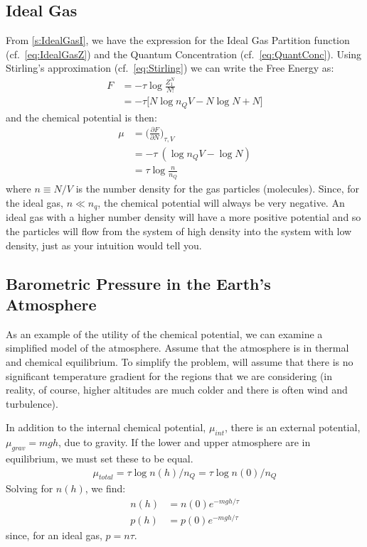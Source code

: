 \subsection{Ideal Gas}
From \cref{s:IdealGasI}, we have the expression for the Ideal Gas
Partition function (cf.~\cref{eq:IdealGasZ}) and the Quantum 
Concentration (cf.~\cref{eq:QuantConc}). Using Stirling's 
approximation (cf.~\cref{eq:Stirling}) we can write the Free Energy
as:
\begin{align}
F &= -\tau \log{\frac{Z_{1}^N}{N!}} \\
  &= -\tau \bigg[N \log{n_Q V} - N \log{N} + N \bigg] 
\end{align}
and the chemical potential is then:
\begin{align}
\mu &= \bigg(\frac{\partial F}{\partial N}\bigg)_{\tau,V} \\
    &= -\tau~(\log{n_Q V} - \log{N}) \\
    &= \tau \log{\frac{n}{n_Q}}
\end{align} 
where $n \equiv N/V$ is the number density for the gas 
particles (molecules). Since, for the ideal gas, $n \ll n_q$, the
chemical potential will always be very negative. An ideal gas
with a higher number density will have a more positive potential
and so the particles will flow from the system of high density
into the system with low density, just as your intuition would
tell you.


\subsection{Barometric Pressure in the Earth's Atmosphere}
As an example of the utility of the chemical potential, we can examine
a simplified model of the atmosphere. Assume that the atmosphere
is in thermal and chemical equilibrium. To simplify the problem,
will assume that there is no significant temperature gradient for the
regions that we are considering (in reality, of course, higher
altitudes are much colder and there is often wind and turbulence).

In addition to the internal chemical potential, $\mu_{int}$, there is
an external potential,$\mu_{grav} = m g h$, due to gravity. If the lower
and upper atmosphere are in equilibrium, we must set these to be equal.
\begin{align}
\mu_{total} = \tau \log{n(h)/n_Q} = \tau \log{n(0)/n_Q}
\end{align}
Solving for $n(h)$, we find:
\begin{align}
n(h) &= n(0) e^{-m g h / \tau} \\
p(h) &= p(0) e^{-m g h / \tau}
\end{align}
since, for an ideal gas, $p = n \tau$.